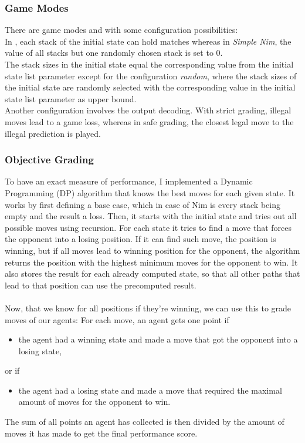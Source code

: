 \documentclass[11pt]{report}
\begin{document}
\begin{enumerate}
                \subsubsection{Game Modes}
    There are game modes  and  with some configuration possibilities:
    \\
    In , each stack of the initial state can hold matches whereas in \textit{Simple Nim}, the value of all stacks but one randomly chosen stack is set to 0.
    \\
    The stack sizes in the initial state equal the corresponding value from the initial state list parameter except for the configuration \textit{random}, where the stack sizes of the initial state are randomly selected with the corresponding value in the initial state list parameter as upper bound.
    \\
    Another configuration involves the output decoding.
    With strict grading, illegal moves lead to a game loss, whereas in safe grading, the closest legal move to the illegal prediction is played.
                \subsubsection{Objective Grading}
    To have an exact measure of performance, I implemented a Dynamic Programming (DP) algorithm that knows the best moves for each given state.
    It works by first defining a base case, which in case of Nim is every stack being empty and the result a loss.
    Then, it starts with the initial state and tries out all possible moves using recursion.
    For each state it tries to find a move that forces the opponent into a losing position.
    If it can find such move, the position is winning, but if all moves lead to winning position for the opponent, the algorithm returns the position with the highest minimum moves for the opponent to win.
    It also stores the result for each already computed state, so that all other paths that lead to that position can use the precomputed result.
    \\ \\
    Now, that we know for all positions if they're winning, we can use this to grade moves of our agents:
    For each move, an agent gets one point if
    \begin{itemize}
        \item the agent had a winning state and made a move that got the opponent into a losing state,
    \end{itemize}
    or if
    \begin{itemize}
        \item the agent had a losing state and made a move that required the maximal amount of moves for the opponent to win.
    \end{itemize}
    The sum of all points an agent has collected is then divided by the amount of moves it has made to get the final performance score.


\end{enumerate}
\end{document}
